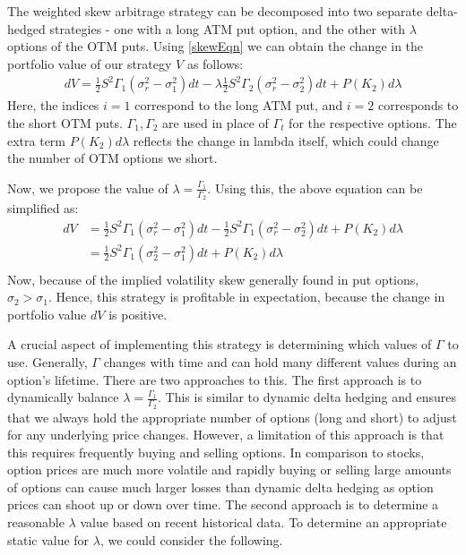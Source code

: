 \documentclass[10pt]{article}
\theoremstyle{definition}
\begin{document}
The weighted skew arbitrage strategy can be decomposed into two separate delta-hedged strategies - one with a long ATM put option, and the other with $\lambda$ options of the OTM puts. Using \ref{skewEqn} we can obtain the change in the portfolio value of our strategy $V$ as follows:
\begin{align*}
    d V = \frac12 S^2 \Gamma_1 (\sigma_r^2 - \sigma_1^2) d t - \lambda \frac12 S^2 \Gamma_2 (\sigma_r^2 - \sigma_2^2) d t + P(K_2) d \lambda
\end{align*}
Here, the indices $i=1$ correspond to the long ATM put, and $i=2$ corresponds to the short OTM puts. $\Gamma_1, \Gamma_2$ are used in place of $\Gamma_t$ for the respective options. The extra term $P(K_2) d \lambda$ reflects the change in lambda itself, which could change the number of OTM options we short. 

Now, we propose the value of $\lambda = \frac{\Gamma_1}{\Gamma_2}$. Using this, the above equation can be simplified as:
\begin{align*}
    d V &= \frac12 S^2 \Gamma_1 (\sigma_r^2 - \sigma_1^2) d t - \frac12 S^2 \Gamma_1 (\sigma_r^2 - \sigma_2^2) d t + P(K_2) d \lambda \\
    &= \frac12 S^2 \Gamma_1 (\sigma_2^2 - \sigma_1^2) d t + P(K_2) d \lambda \\
\end{align*}
Now, because of the implied volatility skew generally found in put options, $\sigma_2 > \sigma_1$. Hence, this strategy is profitable in expectation, because the change in portfolio value $d V$ is positive.

A crucial aspect of implementing this strategy is determining which values of $\Gamma$ to use. Generally, $\Gamma$ changes with time and can hold many different values during an option's lifetime. There are two approaches to this. The first approach is to dynamically balance $\lambda = \frac{\Gamma_1}{\Gamma_2}$. This is similar to dynamic delta hedging and ensures that we always hold the appropriate number of options (long and short) to adjust for any underlying price changes. However, a limitation of this approach is that this requires frequently buying and selling options. In comparison to stocks, option prices are much more volatile and rapidly buying or selling large amounts of options can cause much larger losses than dynamic delta hedging as option prices can shoot up or down over time. The second approach is to determine a reasonable $\lambda$ value based on recent historical data. To determine an appropriate static value for $\lambda$, we could consider the following. 
\end{document}
